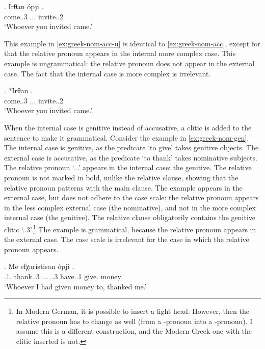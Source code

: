 \exg. Irθan ópji .\\
come..3 ... invite..2\\
`Whoever you invited came.'\label{ex:greek-nom-acc}

This example in \ref{ex:greek-nom-acc-u} is identical to \ref{ex:greek-nom-acc}, except for that the relative pronoun appears in the internal  more complex case. This example is ungrammatical: the relative pronoun does not appear in the external case. The fact that the internal case is more complex is irrelevant.

\exg. *Irθan  .\\
come..3 ... invite..2\\
`Whoever you invited came.'\label{ex:greek-nom-acc-u}

When the internal case is genitive instead of accusative, a clitic is added to the sentence to make it grammatical.
Consider the example in \ref{ex:greek-nom-gen}.
The internal case is genitive, as the predicate  `to give' takes genitive objects.
The external case is accusative, as the predicate  `to thank' takes nominative subjects.
The relative pronoun  `...' appears in the internal case: the genitive. The relative pronoun is not marked in bold, unlike the relative clause, showing that the relative pronoun patterns with the main clause.
The example appears in the external case, but does not adhere to the case scale: the relative pronoun appears in the less complex external case (the nominative), and not in the more complex internal case (the genitive). The relative clause obligatorily contains the genitive clitic  `..3'.\footnote{
In Modern German, it is possible to insert a light head. However, then the relative pronoun has to change as well (from a -pronoun into a -pronoun). I assume this is a different construction, and the Modern Greek one with the clitic inserted is not.
}
The example is grammatical, because the relative pronoun appears in the external case. The case scale is irrelevant for the case in which the relative pronoun appears.

\exg. Me efχarístisan ópji    .\\
 .1. thank..3 ... ..3 have..1 give. money\\
 `Whoever I had given money to, thanked me.'\label{ex:greek-nom-gen}

